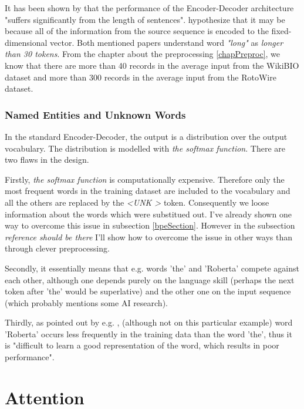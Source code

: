It has been shown by \citep{cho2014properties} that the performance of the Encoder-Decoder architecture "suffers significantly from the length of sentences". \citep{bahdanau2016neural} hypothesize that it may be because all of the information from the source sequence is encoded to the fixed-dimensional vector. Both mentioned papers understand word \emph{"long"} as \emph{longer than 30 tokens}. From the chapter about the preprocessing \ref{chapPreproc}, we know that there are more than 40 records in the average input from the WikiBIO dataset and more than 300 records in the average input from the RotoWire dataset.

\subsubsection{Named Entities and Unknown Words}

In the standard Encoder-Decoder, the output is a distribution over the output vocabulary. The distribution is modelled with \emph{the softmax function}. There are two flaws in the design.

Firstly, \emph{the softmax function} is computationally expensive. Therefore only the most frequent words in the training dataset are included to the vocabulary and all the others are replaced by the \emph{\textless UNK \textgreater} token. Consequently we loose information about the words which were substitued out. I've already shown one way to overcome this issue in subsection \ref{bpeSection}. However in the subsection \emph{reference should be there} I'll show how to overcome the issue in other ways than through clever preprocessing.

Secondly, it essentially means that e.g. words 'the' and 'Roberta' compete against each other, although one depends purely on the language skill (perhaps the next token after 'the' would be superlative) and the other one on the input sequence (which probably mentions some AI research).

Thirdly, as pointed out by e.g. \citep{gulcehre2016pointing}, (although not on this particular example) word 'Roberta' occurs less frequently in the training data than the word 'the', thus it is "difficult to learn a good representation of the word, which results in poor performance".

\section{Attention}

